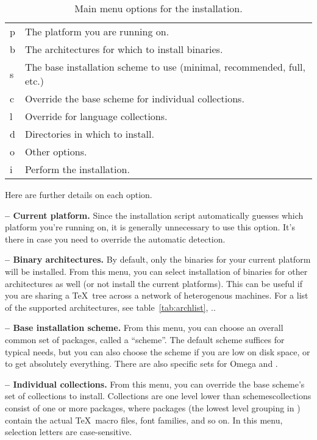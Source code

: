 \documentclass{article}
\begin{document}
\begin{table}[H]
\caption{Main menu options for the installation.}
\label{tab:main-menu-options}
\begin{tabular}{>{\ttfamily}ll}
p & The platform you are running on.\\
b & The architectures for which to install binaries.\\
s & The base installation scheme to use (minimal, recommended,
          full, etc.)\\
c & Override the base scheme for individual collections.\\
l & Override for language collections.\\
d & Directories in which to install.\\
o & Other options.\\
i & Perform the installation.\\
\end{tabular}
\end{table}

Here are further details on each option.

\textbf{ -- Current platform.}  Since the installation script
automatically guesses which platform you're running on, it is generally
unnecessary to use this option.  It's there in case you need to override
the automatic detection.

\textbf{ -- Binary architectures.}  By default, only the
binaries for your current platform will be installed.  From this menu,
you can select installation of binaries for other architectures as well
(or not install the current platforms).  This can be useful if you are
sharing a \TeX\ tree across a network of heterogenous machines.  For a
list of the supported architectures, see table~\ref{tab:archlist},
\p.\pageref{tab:archlist}.

\textbf{ -- Base installation scheme.}  From this menu, you
can choose an overall common set of packages, called a ``scheme''.  The
default  scheme suffices for typical needs, but you
can also choose the  scheme if you are low on disk space,
or  to get absolutely everything.  There are also specific
sets for Omega and .

\textbf{ -- Individual collections.}  From this menu, you can
override the base scheme's set of collections to install.  Collections
are one level lower than schemes\Dash collections consist of
one or more packages, where packages (the lowest level grouping in \TL)
contain the actual \TeX\ macro files, font families, and so on.
In this menu, selection letters are case-sensitive.
\end{document}
